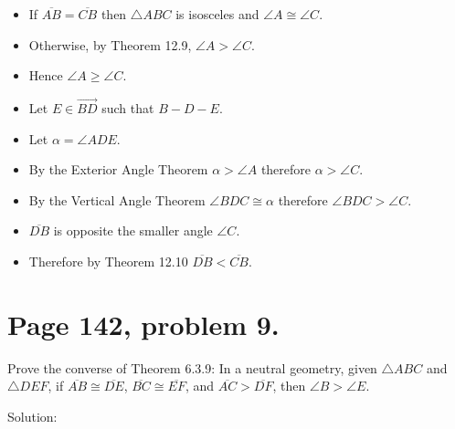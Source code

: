 \documentclass[12pt,openany]{report}
\begin{document}
\begin{itemize}

\item[]
If $\overline{AB}=\overline{CB}$ then $\triangle ABC$ is isosceles and $\angle A\cong\angle C$.

\item[]
Otherwise, by Theorem 12.9, $\angle A>\angle C$.

\item[]
Hence $\angle A\ge\angle C$.

\item[]
Let $E\in\overrightarrow{BD}$ such that $B{-}D{-}E$.

\item[]
Let $\alpha=\angle ADE$.

\item[]
By the Exterior Angle Theorem $\alpha>\angle A$ therefore $\alpha>\angle C$.

\item[]
By the Vertical Angle Theorem $\angle BDC\cong\alpha$ therefore $\angle BDC>\angle C$.

\item[]
$\overline{DB}$ is opposite the smaller angle $\angle C$.

\item[]
Therefore by Theorem 12.10 $\overline{DB}<\overline{CB}$.

\end{itemize}

\newpage

\section*{Page 142, problem 9.}

Prove the converse of Theorem 6.3.9: In a neutral geometry, given $\triangle ABC$ and
$\triangle DEF$, if $\overline{AB}\cong\overline{DE}$,
$\overline{BC}\cong\overline{EF}$,
and $\overline{AC}>\overline{DF}$, then $\angle B>\angle E$.

\bigskip
\noindent
Solution:
\end{document}
